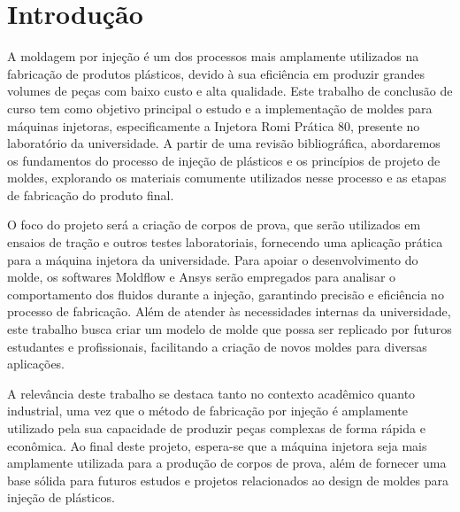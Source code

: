 \chapter*[Introdução]{Introdução}

A moldagem por injeção é um dos processos mais amplamente utilizados na fabricação de produtos plásticos, devido à sua eficiência em produzir grandes volumes de peças com baixo custo e alta qualidade. Este trabalho de conclusão de curso tem como objetivo principal o estudo e a implementação de moldes para máquinas injetoras, especificamente a Injetora Romi Prática 80, presente no laboratório da universidade. A partir de uma revisão bibliográfica, abordaremos os fundamentos do processo de injeção de plásticos e os princípios de projeto de moldes, explorando os materiais comumente utilizados nesse processo e as etapas de fabricação do produto final.

O foco do projeto será a criação de corpos de prova, que serão utilizados em ensaios de tração e outros testes laboratoriais, fornecendo uma aplicação prática para a máquina injetora da universidade. Para apoiar o desenvolvimento do molde, os softwares Moldflow e Ansys serão empregados para analisar o comportamento dos fluidos durante a injeção, garantindo precisão e eficiência no processo de fabricação. Além de atender às necessidades internas da universidade, este trabalho busca criar um modelo de molde que possa ser replicado por futuros estudantes e profissionais, facilitando a criação de novos moldes para diversas aplicações.

A relevância deste trabalho se destaca tanto no contexto acadêmico quanto industrial, uma vez que o método de fabricação por injeção é amplamente utilizado pela sua capacidade de produzir peças complexas de forma rápida e econômica. Ao final deste projeto, espera-se que a máquina injetora seja mais amplamente utilizada para a produção de corpos de prova, além de fornecer uma base sólida para futuros estudos e projetos relacionados ao design de moldes para injeção de plásticos.



